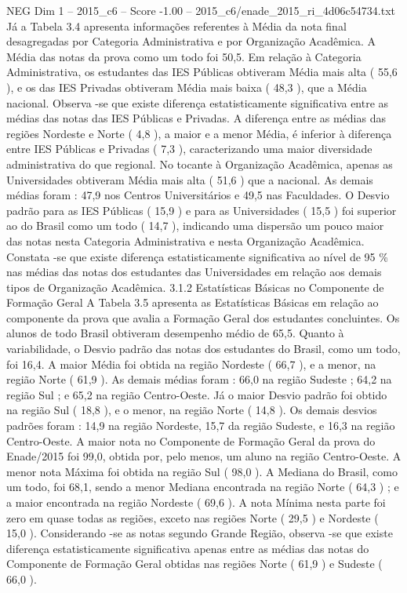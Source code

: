 \begin{textsample}{NEG Dim 1 – 2015\_c6 – Score -1.00 – 2015\_c6/enade\_2015\_ri\_4d06c54734.txt}
Já a Tabela 3.4 apresenta informações referentes à Média da nota final desagregadas por Categoria Administrativa e por Organização Acadêmica.
A Média das notas da prova como um todo foi 50,5.
Em relação à Categoria Administrativa, os estudantes das IES Públicas obtiveram Média mais alta ( 55,6 ), e os das IES Privadas obtiveram Média mais baixa ( 48,3 ), que a Média nacional.
Observa -se que existe diferença estatisticamente significativa entre as médias das notas das IES Públicas e Privadas.
A diferença entre as médias das regiões Nordeste e Norte ( 4,8 ), a maior e a menor Média, é inferior à diferença entre IES Públicas e Privadas ( 7,3 ), caracterizando uma maior diversidade administrativa do que regional.
No tocante à Organização Acadêmica, apenas as Universidades obtiveram Média mais alta ( 51,6 ) que a nacional.
As demais médias foram : 47,9 nos Centros Universitários e 49,5 nas Faculdades.
O Desvio padrão para as IES Públicas ( 15,9 ) e para as Universidades ( 15,5 ) foi superior ao do Brasil como um todo ( 14,7 ), indicando uma dispersão um pouco maior das notas nesta Categoria Administrativa e nesta Organização Acadêmica.
Constata -se que existe diferença estatisticamente significativa ao nível de 95 \% nas médias das notas dos estudantes das Universidades em relação aos demais tipos de Organização Acadêmica. 3.1.2 Estatísticas Básicas no Componente de Formação Geral A Tabela 3.5 apresenta as Estatísticas Básicas em relação ao componente da prova que avalia a Formação Geral dos estudantes concluintes.
Os alunos de todo Brasil obtiveram desempenho médio de 65,5.
Quanto à variabilidade, o Desvio padrão das notas dos estudantes do Brasil, como um todo, foi 16,4.
A maior Média foi obtida na região Nordeste ( 66,7 ), e a menor, na região Norte ( 61,9 ).
As demais médias foram : 66,0 na região Sudeste ; 64,2 na região Sul ; e 65,2 na região Centro-Oeste.
Já o maior Desvio padrão foi obtido na região Sul ( 18,8 ), e o menor, na região Norte ( 14,8 ).
Os demais desvios padrões foram : 14,9 na região Nordeste, 15,7 da região Sudeste, e 16,3 na região Centro-Oeste.
A maior nota no Componente de Formação Geral da prova do Enade/2015 foi 99,0, obtida por, pelo menos, um aluno na região Centro-Oeste.
A menor nota Máxima foi obtida na região Sul ( 98,0 ).
A Mediana do Brasil, como um todo, foi 68,1, sendo a menor Mediana encontrada na região Norte ( 64,3 ) ; e a maior encontrada na região Nordeste ( 69,6 ).
A nota Mínima nesta parte foi zero em quase todas as regiões, exceto nas regiões Norte ( 29,5 ) e Nordeste ( 15,0 ).
Considerando -se as notas segundo Grande Região, observa -se que existe diferença estatisticamente significativa apenas entre as médias das notas do Componente de Formação Geral obtidas nas regiões Norte ( 61,9 ) e Sudeste ( 66,0 ).

\end{textsample}
